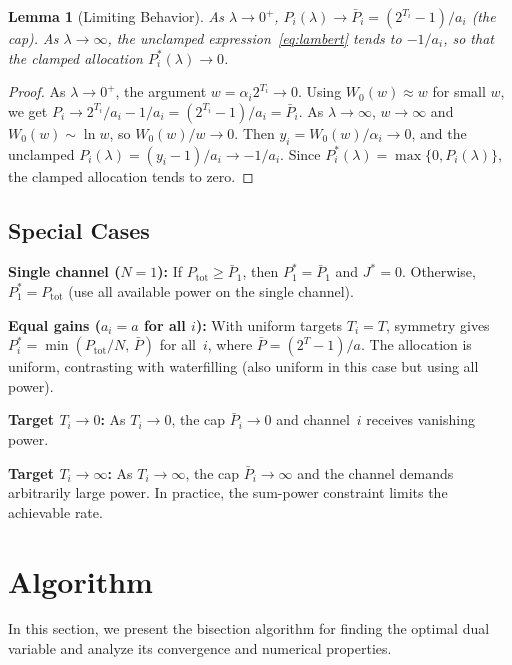 \documentclass[journal]{IEEEtran}
\newtheorem{lemma}{Lemma}
\begin{document}
\begin{lemma}[Limiting Behavior]
\label{lem:limits}
As $\lambda \to 0^+$, $P_i(\lambda) \to \bar{P}_i = (2^{T_i}-1)/a_i$ (the cap).
As $\lambda \to \infty$, the unclamped expression~\eqref{eq:lambert} tends to $-1/a_i$, so that the clamped allocation $P_i^*(\lambda) \to 0$.
\end{lemma}

\begin{proof}
As $\lambda \to 0^+$, the argument $w = \alpha_i 2^{T_i} \to 0$.
Using $W_0(w) \approx w$ for small $w$, we get $P_i \to 2^{T_i}/a_i - 1/a_i = (2^{T_i}-1)/a_i = \bar{P}_i$.
As $\lambda \to \infty$, $w \to \infty$ and $W_0(w) \sim \ln w$, so $W_0(w)/w \to 0$.
Then $y_i = W_0(w)/\alpha_i \to 0$, and the unclamped $P_i(\lambda) = (y_i - 1)/a_i \to -1/a_i$.
Since $P_i^*(\lambda) = \max\{0, P_i(\lambda)\}$, the clamped allocation tends to zero.
\end{proof}

\subsection{Special Cases}

\textbf{Single channel ($N=1$):}
If $P_{\mathrm{tot}} \ge \bar{P}_1$, then $P_1^* = \bar{P}_1$ and $J^* = 0$.
Otherwise, $P_1^* = P_{\mathrm{tot}}$ (use all available power on the single channel).

\textbf{Equal gains ($a_i = a$ for all $i$):}
With uniform targets $T_i = T$, symmetry gives $P_i^* = \min(P_{\mathrm{tot}}/N,\, \bar{P})$ for all~$i$, where $\bar{P} = (2^T - 1)/a$.
The allocation is uniform, contrasting with waterfilling (also uniform in this case but using all power).

\textbf{Target $T_i \to 0$:}
As $T_i \to 0$, the cap $\bar{P}_i \to 0$ and channel~$i$ receives vanishing power.

\textbf{Target $T_i \to \infty$:}
As $T_i \to \infty$, the cap $\bar{P}_i \to \infty$ and the channel demands arbitrarily large power.
In practice, the sum-power constraint limits the achievable rate.

\section{Algorithm}
\label{sec:algorithm}

In this section, we present the bisection algorithm for finding the optimal dual variable and analyze its convergence and numerical properties.
\end{document}
